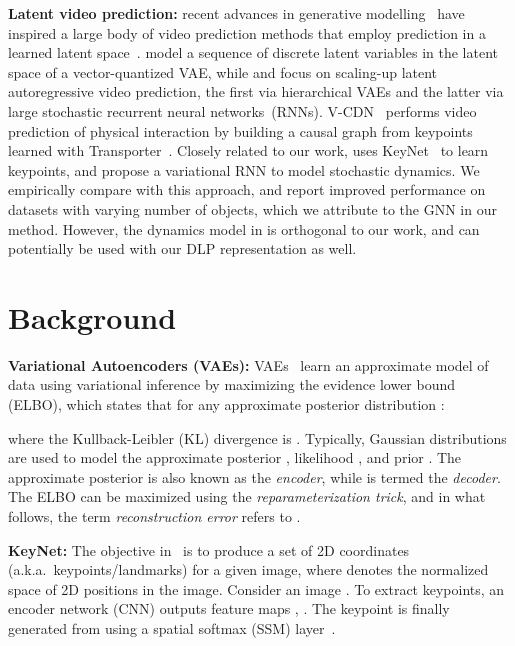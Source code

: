 \documentclass[nohyperref]{article}
\theoremstyle{plain}
\theoremstyle{definition}
\theoremstyle{remark}
\begin{document}
\textbf{Latent video prediction:} recent advances in generative modelling~\citep[e.g.,][]{razavi2019vqvqae, karras2020analyzing, daniel2020soft} have inspired a large body of video prediction methods that employ prediction in a learned latent space~\citep{minderer2019unsupervised, wu2021greedy, walker2021predicting, villegas2019high, yan2021videogpt}. \citet{walker2021predicting, yan2021videogpt} model a sequence of discrete latent variables in the latent space of a vector-quantized VAE, while \citet{wu2021greedy} and \citet{villegas2019high} focus on scaling-up latent autoregressive video prediction, the first via hierarchical VAEs and the latter via large stochastic recurrent neural networks~(RNNs). V-CDN~\citep{li2020causal} performs video prediction of physical interaction by building a causal graph from keypoints learned with Transporter~\citep{kulkarni2019transporter}.
Closely related to our work, \citet{minderer2019unsupervised} uses KeyNet~\citep{jakab2018unsupervised} to learn keypoints, and propose a variational RNN to model stochastic dynamics. We empirically compare with this approach, and report improved performance on datasets with varying number of objects, which we attribute to the GNN in our method. However, the 
dynamics model in \citet{minderer2019unsupervised} is orthogonal to our work, and can potentially be used with our DLP representation as well.




\section{Background}
\label{sec:bg}
\textbf{Variational Autoencoders (VAEs):} VAEs~\citep{kingma2014autoencoding} learn an approximate model of data  using variational inference by maximizing the evidence lower bound (ELBO), which states that for any approximate posterior distribution : 

where the Kullback-Leibler (KL) divergence is
. Typically, Gaussian distributions are used to model the approximate posterior , likelihood , and prior . The approximate posterior  is also known as the \emph{encoder}, while  is termed the \emph{decoder}. The ELBO can be maximized using the \textit{reparameterization trick}, and in what follows, the term \textit{reconstruction error} refers to .

\textbf{KeyNet:} The objective in~\citet{jakab2018unsupervised} is to produce a set of  2D coordinates (a.k.a.~keypoints/landmarks)  for a given image, where  denotes the normalized space of 2D positions in the image.
Consider an image . To extract keypoints, an encoder network (CNN) outputs  feature maps , .
The keypoint  is finally generated from  using a spatial softmax (SSM) layer~\cite{finn2016deep}.
\end{document}
